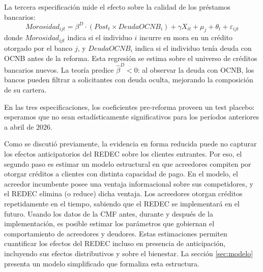 \documentclass[11pt]{article}
\theoremstyle{plain}
\theoremstyle{plain}
\begin{document}
La tercera especificación mide el efecto sobre la calidad de los préstamos bancarios:
\begin{equation}
    Morosidad_{ijt} = \beta^D \cdot (Post_t \times DeudaOCNB_i) + \gamma X_{it} + \mu_j + \theta_t + \varepsilon_{ijt}
    \label{eqn:delinquency}
\end{equation}
donde $Morosidad_{ijt}$ indica si el individuo $i$ incurre en mora en un crédito otorgado por el banco $j$, y $DeudaOCNB_i$ indica si el individuo tenía deuda con OCNB antes de la reforma. Esta regresión se estima sobre el universo de créditos bancarios nuevos. La teoría predice $\hat{\beta}^D < 0$: al observar la deuda con OCNB, los bancos pueden filtrar a solicitantes con deuda oculta, mejorando la composición de su cartera.

En las tres especificaciones, los coeficientes pre-reforma proveen un test placebo: esperamos que no sean estadísticamente significativos para los períodos anteriores a abril de 2026.

Como se discutió previamente, la evidencia en forma reducida puede no capturar los efectos anticipatorios del REDEC sobre los clientes entrantes. Por eso, el segundo paso es estimar un modelo estructural en que acreedores compiten por otorgar créditos a clientes con distinta capacidad de pago. En el modelo, el acreedor incumbente posee una ventaja informacional sobre sus competidores, y el REDEC elimina (o reduce) dicha ventaja. Los acreedores otorgan créditos repetidamente en el tiempo, sabiendo que el REDEC se implementará en el futuro. Usando los datos de la CMF antes, durante y después de la implementación, es posible estimar los parámetros que gobiernan el comportamiento de acreedores y deudores. Estas estimaciones permiten cuantificar los efectos del REDEC incluso en presencia de anticipación, incluyendo sus efectos distributivos y sobre el bienestar. La sección \ref{sec:modelo} presenta un modelo simplificado que formaliza esta estructura.

 


\end{document}
